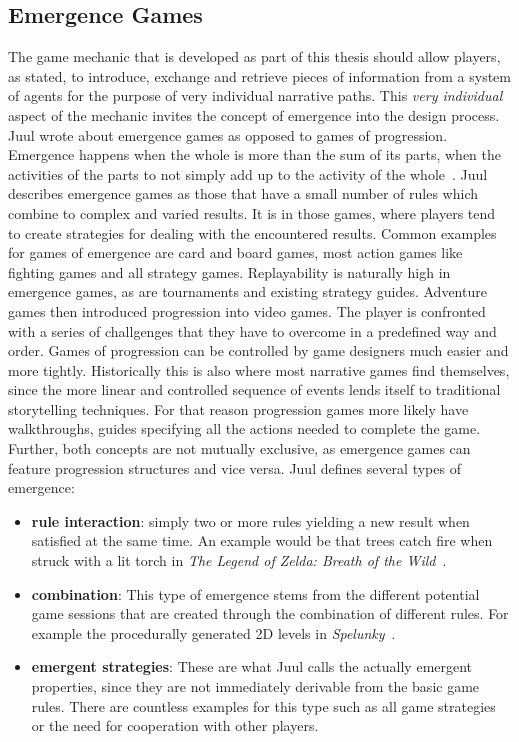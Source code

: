 \subsection{Emergence Games}
The game mechanic that is developed as part of this thesis should allow players, as stated, to introduce, exchange and retrieve pieces of information from a system of agents for the purpose of very individual narrative paths. This \textit{very individual} aspect of the mechanic invites the concept of emergence into the design process. Juul wrote about emergence games as opposed to games of progression.\\
Emergence happens when the whole is more than the sum of its parts, when the activities of the parts to not simply add up to the activity of the whole~\cite{Holland2000}. Juul describes emergence games as those that have a small number of rules which combine to complex and varied results. It is in those games, where players tend to create strategies for dealing with the encountered results. Common examples for games of emergence are card and board games, most action games like fighting games and all strategy games. Replayability is naturally high in emergence games, as are tournaments and existing strategy guides. Adventure games then introduced progression into video games. The player is confronted with a series of challgenges that they have to overcome in a predefined way and order. Games of progression can be controlled by game designers much easier and more tightly. Historically this is also where most narrative games find themselves, since the more linear and controlled sequence of events lends itself to traditional storytelling techniques. For that reason progression games more likely have walkthroughs, guides specifying all the actions needed to complete the game.~\cite{Juul2002}\\
Further, both concepts are not mutually exclusive, as emergence games can feature progression structures and vice versa. Juul defines several types of emergence:
\begin{itemize}
	\item \textbf{rule interaction}: simply two or more rules yielding a new result when satisfied at the same time. An example would be that trees catch fire when struck with a lit torch in \textit{The Legend of Zelda: Breath of the Wild}~\cite{zeldabotw}.
	\item \textbf{combination}: This type of emergence stems from the different potential game sessions that are created through the combination of different rules. For example the procedurally generated 2D levels in \textit{Spelunky}~\cite{spelunky}.
	\item \textbf{emergent strategies}: These are what Juul calls the actually emergent properties, since they are not immediately derivable from the basic game rules. There are countless examples for this type such as all game strategies or the need for cooperation with other players.
\end{itemize} 
